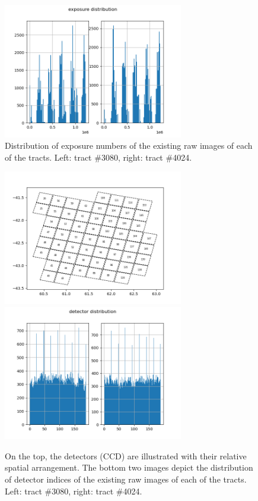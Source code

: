 \documentclass[DM,authoryear,toc]{lsstdoc}
\begin{document}
\begin{figure}[h!]
  \centering
  \includegraphics[width=0.7\textwidth]{exposure_hist.png}
  \caption{Distribution of exposure numbers of the existing raw images of each of the tracts. Left: tract \#3080, right: tract \#4024.}
  \label{fig:exposure_hist}
\end{figure}

\begin{figure}[h!]
  \centering
  \includegraphics[width=0.7\textwidth]{tract_detectors.png}
  \includegraphics[width=0.7\textwidth]{detector_hist.png}
  \caption{On the top, the detectors (CCD) are illustrated with their relative spatial arrangement. The bottom two images depict the distribution of detector indices of the existing raw images of each of the tracts. Left: tract \#3080, right: tract \#4024.}
  \label{fig:detector_hist}
\end{figure}
\end{document}
